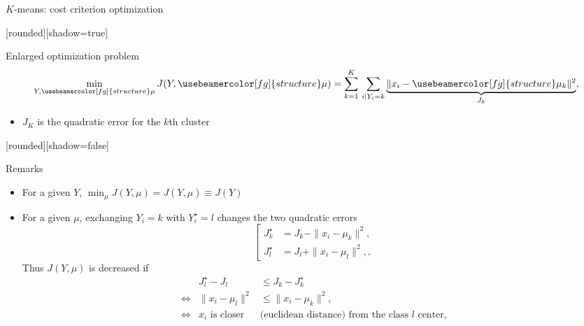 \documentclass[compress, smaller, serif, 9pt]{beamer}
\newcommand{\structuretext}[1]{{\usebeamercolor[fg]{structure} #1}}
\begin{document}
\begin{frame}{$K$-means: cost criterion optimization}
\medskip

% 

[rounded][shadow=true]


\begin{block}{Enlarged optimization problem}
\vspace{-2mm}
$$
\min_{Y,\structuretext{\mu}} J(Y,\structuretext{\mu})= \sum_{k=1}^K \, \sum_{i|Y_i=k}  \underbrace{\| x_i-\structuretext{\mu_k} \|^2}_{J_k},
$$ \vspace{-4mm}
\begin{itemize}
 \item $J_K$ is the quadratic error for the $k$th cluster
\end{itemize}
\end{block}

[rounded][shadow=false]
\begin{block}{Remarks}
\begin{itemize} 
\item For a given $Y$, $\min_{\mu} J(Y,\mu)= J(Y,\widehat{\mu}) \equiv J(Y)$  
\item For a given $\mu$, exchanging $Y_i=k$ with $Y_i^{\star}=l$ changes the two quadratic errors
$$\left[ 
\begin{array}{ll}
J_k^{\star} &= J_k - \| x_i - \mu_k \|^2,\\
J_l^{\star} &= J_l + \| x_i - \mu_l \|^2,,
\end{array}\right.$$
Thus $J(Y,\mu)$ is decreased if 
$$ 
\begin{array}{lll}
&  J_l^{\star} -  J_l &\le J_k - J_k^{\star}\\
\Leftrightarrow & \| x_i - \mu_l \|^2 & \le \| x_i - \mu_k \|^2,\\
\Leftrightarrow & x_i \textrm{ is closer } & \textrm{(euclidean distance) from the class $l$ center},
\end{array}$$
\end{itemize}
\end{block}

\end{frame}
\end{document}
